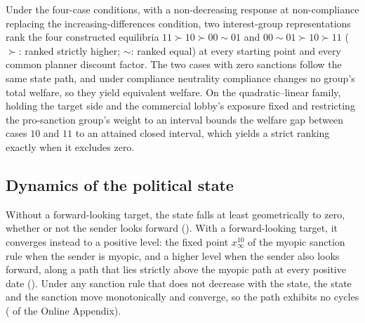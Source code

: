  Under the four-case conditions, with a non-decreasing response at
non-compliance replacing the increasing-differences condition, two interest-group
representations rank the four constructed equilibria $11\succ10\succ00\sim01$ and
$00\sim01\succ10\succ11$ ($\succ$: ranked strictly higher; $\sim$: ranked equal) at
every starting point and every common planner discount
factor. The two cases with zero sanctions follow the same state path, and under
compliance neutrality compliance changes no group's total welfare, so they yield
equivalent welfare. On the quadratic--linear family, holding the target side and the
commercial lobby's exposure fixed and restricting the pro-sanction group's weight to an
interval bounds the welfare gap between cases $10$ and $11$ to an attained closed
interval, which yields a strict ranking exactly when it excludes zero.

\subsection{Dynamics of the political state}
\label{sec:discussion:path}

 Without a forward-looking target, the state
falls at least geometrically to zero, whether or not the sender looks forward
(). With a forward-looking target, it
converges instead to a positive level: the fixed point $x^{10}_\infty$ of the myopic
sanction rule when the sender is myopic, and a higher level when the sender also looks
forward, along a path that lies strictly above the myopic path at every positive date
(). Under any sanction rule that does not decrease with the
state, the state and the sanction move monotonically and converge, so the path exhibits
no cycles ( of the Online Appendix).

